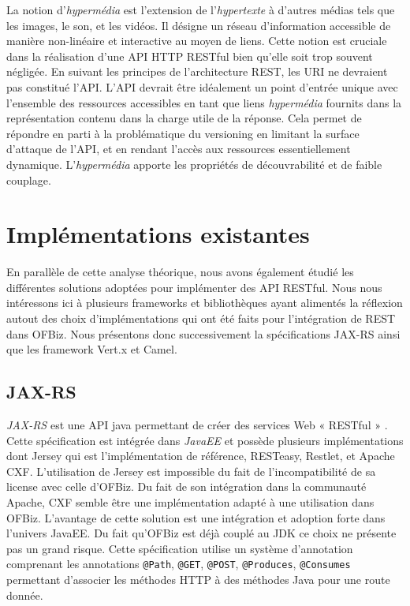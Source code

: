 \documentclass[a4paper, 11pt]{report}
\begin{document}
La notion d'\emph{hypermédia} est l'extension de l'\emph{hypertexte} à
d'autres médias tels que les images, le son, et les vidéos. Il désigne
un réseau d'information accessible de manière non-linéaire et
interactive au moyen de liens. Cette notion est cruciale dans la
réalisation d'une API HTTP RESTful bien qu'elle soit trop souvent
négligée. En suivant les principes de l'architecture REST, les URI ne
devraient pas constitué l'API. L'API devrait être idéalement un point
d'entrée unique avec l'ensemble des ressources accessibles en tant que
liens \emph{hypermédia} fournits dans la représentation contenu dans
la charge utile de la réponse. Cela permet de répondre en parti à la
problématique du versioning en limitant la surface d'attaque de l'API,
et en rendant l'accès aux ressources essentiellement
dynamique. L'\emph{hypermédia} apporte les propriétés de
découvrabilité et de faible couplage.

\section{Implémentations existantes}

En parallèle de cette analyse théorique, nous avons également étudié
les différentes solutions adoptées pour implémenter des API RESTful.
Nous nous intéressons ici à plusieurs frameworks et bibliothèques
ayant alimentés la réflexion autout des choix d'implémentations qui
ont été faits pour l'intégration de REST dans OFBiz. Nous présentons
donc successivement la spécifications JAX-RS ainsi que les framework
Vert.x et Camel.

\subsection{JAX-RS}

\emph{JAX-RS} est une API java permettant de créer des services Web «
RESTful » \cite{pericas2013jax}. Cette spécification est intégrée dans
\emph{JavaEE} et possède plusieurs implémentations dont Jersey qui est
l'implémentation de référence, RESTeasy, Restlet, et Apache CXF.
L'utilisation de Jersey est impossible du fait de l'incompatibilité de
sa license avec celle d'OFBiz. Du fait de son intégration dans la
communauté Apache, CXF semble être une implémentation adapté à une
utilisation dans OFBiz. L'avantage de cette solution est une
intégration et adoption forte dans l'univers JavaEE. Du fait qu'OFBiz
est déjà couplé au JDK ce choix ne présente pas un grand risque. Cette
spécification utilise un système d'annotation comprenant les
annotations \verb=@Path=, \verb=@GET=, \verb=@POST=, \verb=@Produces=,
\verb=@Consumes= permettant d'associer les méthodes HTTP à des
méthodes Java pour une route donnée.
\end{document}
